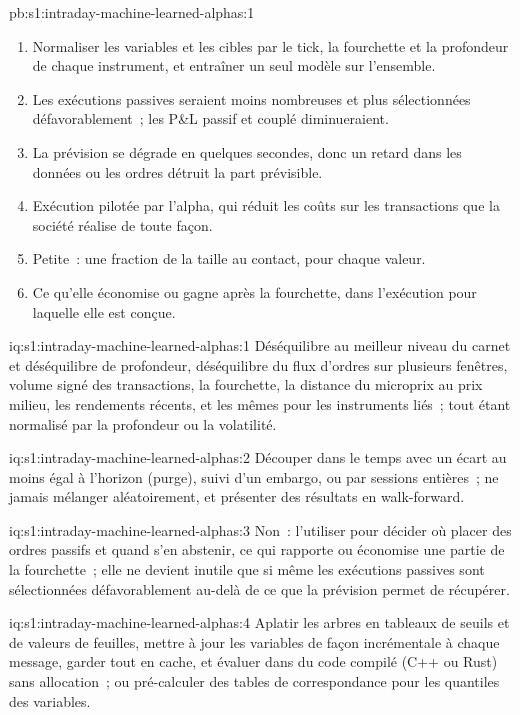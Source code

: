 \begin{solution}{pb:s1:intraday-machine-learned-alphas:1}
\begin{enumerate}
\item Normaliser les variables et les cibles par le tick, la fourchette et la profondeur de chaque instrument, et entraîner un seul modèle sur l'ensemble.
\item Les exécutions passives seraient moins nombreuses et plus sélectionnées défavorablement~; les P\&L passif et couplé diminueraient.
\item La prévision se dégrade en quelques secondes, donc un retard dans les données ou les ordres détruit la part prévisible.
\item Exécution pilotée par l'alpha, qui réduit les coûts sur les transactions que la société réalise de toute façon.
\item Petite~: une fraction de la taille au contact, pour chaque valeur.
\item Ce qu'elle économise ou gagne après la fourchette, dans l'exécution pour laquelle elle est conçue.
\end{enumerate}
\end{solution}

\begin{solution}{iq:s1:intraday-machine-learned-alphas:1}
Déséquilibre au meilleur niveau du carnet et déséquilibre de profondeur, déséquilibre du flux d'ordres sur plusieurs fenêtres, volume signé des transactions, la fourchette, la distance du microprix au prix milieu, les rendements
récents, et les mêmes pour les instruments liés~; tout étant normalisé par la profondeur ou la volatilité.
\end{solution}

\begin{solution}{iq:s1:intraday-machine-learned-alphas:2}
Découper dans le temps avec un écart au moins égal à l'horizon (purge), suivi d'un embargo, ou par sessions entières~; ne jamais mélanger aléatoirement, et présenter des résultats en walk-forward.
\end{solution}

\begin{solution}{iq:s1:intraday-machine-learned-alphas:3}
Non~: l'utiliser pour décider où placer des ordres passifs et quand s'en abstenir, ce qui rapporte ou économise une partie de la fourchette~; elle ne devient inutile que si même les exécutions passives
sont sélectionnées défavorablement au-delà de ce que la prévision permet de récupérer.
\end{solution}

\begin{solution}{iq:s1:intraday-machine-learned-alphas:4}
Aplatir les arbres en tableaux de seuils et de valeurs de feuilles, mettre à jour les variables de façon incrémentale à chaque message, garder tout en cache, et évaluer
dans du code compilé (C++ ou Rust) sans allocation~; ou pré-calculer des tables de correspondance pour les quantiles des variables.
\end{solution}

